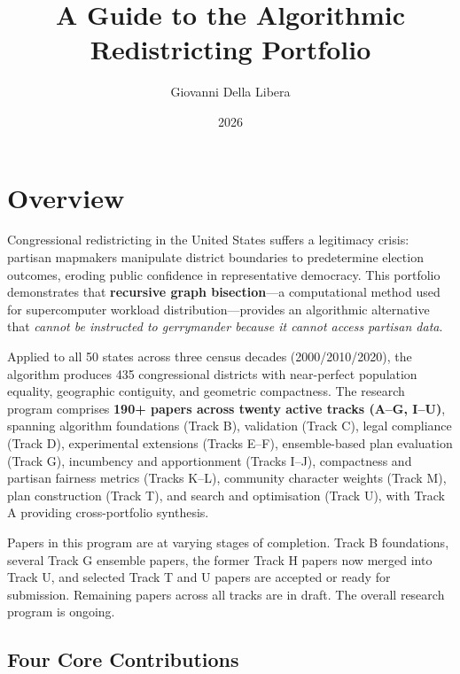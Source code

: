 \documentclass[12pt]{article}
\title{\textbf{A Guide to the Algorithmic Redistricting Portfolio}}
\author{Giovanni Della Libera}
\date{2026}
\begin{document}
\maketitle
\tableofcontents

\newpage

\section{Overview}

Congressional redistricting in the United States suffers a legitimacy crisis:
partisan mapmakers manipulate district boundaries to predetermine election
outcomes, eroding public confidence in representative democracy. This portfolio
demonstrates that \textbf{recursive graph bisection}---a computational method
used for supercomputer workload distribution---provides an algorithmic
alternative that \emph{cannot be instructed to gerrymander because it cannot
access partisan data}.

Applied to all 50 states across three census decades (2000/2010/2020), the
algorithm produces 435 congressional districts with near-perfect population
equality, geographic contiguity, and geometric compactness. The research
program comprises \textbf{190+ papers across twenty active tracks (A--G,
I--U)}, spanning algorithm foundations (Track B), validation (Track C),
legal compliance (Track D), experimental extensions (Tracks E--F),
ensemble-based plan evaluation (Track G), incumbency and apportionment
(Tracks I--J), compactness and partisan fairness metrics (Tracks K--L),
community character weights (Track M), plan construction (Track T), and
search and optimisation (Track U), with Track A providing cross-portfolio
synthesis.

Papers in this program are at varying stages of completion. Track B
foundations, several Track G ensemble papers, the former Track H papers now
merged into Track U, and selected Track T and U papers are accepted or ready
for submission. Remaining papers across all tracks are in draft. The overall
research program is ongoing.

\subsection*{Four Core Contributions}
\end{document}
